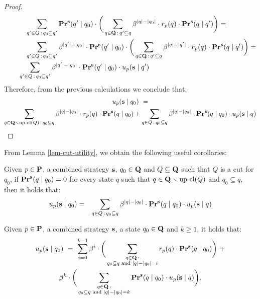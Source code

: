 \begin{proof}
\begin{align*}
&\hspace{30pt} \sum_{q' \in Q \,:\, q_0 \subseteq q'} \mathbf{Pr}^{\mathbf{s}}(q' \mid q_0) \cdot \bigg(\sum_{q \in \mathbf{Q} \,:\, q' \subseteq q} \beta^{|q|-|q_0|} \cdot r_p(q) \cdot  \mathbf{Pr}^{\mathbf{s}}(q \mid q')\bigg)  =\\
&\hspace{30pt} \sum_{q' \in Q \,:\, q_0 \subseteq q'} \beta^{|q'|-|q_0|} \cdot \mathbf{Pr}^{\mathbf{s}}(q' \mid q_0) \cdot \bigg(\sum_{q \in \mathbf{Q} \,:\, q' \subseteq q} \beta^{|q|-|q'|} \cdot r_p(q) \cdot  \mathbf{Pr}^{\mathbf{s}}(q \mid q')\bigg)  =\\
&\hspace{20pt} \sum_{q' \in Q \,:\, q_0 \subseteq q'} \beta^{|q'|-|q_0|} \cdot \mathbf{Pr}^{\mathbf{s}}(q' \mid q_0) \cdot u_p(\mathbf{s} \mid q')
\end{align*}
Therefore, from the previous calculations we conclude that:
\begin{multline*}
u_p(\mathbf{s} \mid q_0) \ = \\
\sum_{q \in \mathbf{Q} \smallsetminus \text{\rm up-cl}(Q)\,:\, q_0 \subseteq q} \beta^{|q|-|q_0|} \cdot r_p(q) \cdot \mathbf{Pr}^{\mathbf{s}}(q \mid q_0) + 
\sum_{q \in Q \,:\, q_0 \subseteq q} \beta^{|q|-|q_0|} \cdot \mathbf{Pr}^{\mathbf{s}}(q \mid q_0) \cdot u_p(\mathbf{s} \mid q)
\end{multline*}
\end{proof}
From Lemma \ref{lem-cut-utility}, we obtain the following useful corollaries: 

\begin{mycor}\label{cor-cut-1}
Given $p \in \mathbf{P}$, a combined strategy $\mathbf{s}$, $q_0 \in \mathbf{Q}$ and $Q \subseteq \mathbf{Q}$ such that $Q$ is a cut for $q_0$, if $\mathbf{Pr}^{\mathbf{s}}(q \mid q_0) = 0$ for every state $q$ such that $q \in \mathbf{Q} \smallsetminus \text{\rm up-cl}(Q)$ and $q_0 \subseteq q$, then it holds that:
\begin{eqnarray*}
u_p(\mathbf{s} \mid q_0) & = &
\sum_{q \in Q \,:\, q_0 \subseteq q} \beta^{|q|-|q_0|} \cdot \mathbf{Pr}^{\mathbf{s}}(q \mid q_0) \cdot u_p(\mathbf{s} \mid q)
\end{eqnarray*}
\end{mycor}

\begin{mycor}\label{cor-dist-k}
Given $p \in \mathbf{P}$, a combined strategy $\mathbf{s}$, a state $q_0 \in \mathbf{Q}$ and $k \geq 1$, it holds that:
\begin{multline*}
u_p(\mathbf{s} \mid q_0) \ = \  
\sum_{i=0}^{k-1} \beta^i \cdot \bigg(\sum_{\substack{q \in \mathbf{Q} \,: \\ q_0 \subseteq q \text{ {\rm and} } |q| - |q_0| = i}}
r_p(q) \cdot \mathbf{Pr}^{\mathbf{s}}(q \mid q_0)\bigg) \ + \\
\beta^k \cdot 
\bigg(\sum_{\substack{q \in \mathbf{Q} \,: \\ q_0 \subseteq q \text{ {\rm and} } |q| - |q_0| = k}}
\mathbf{Pr}^{\mathbf{s}}(q \mid q_0) \cdot u_p(\mathbf{s} \mid q)\bigg).
\end{multline*}
\end{mycor}

